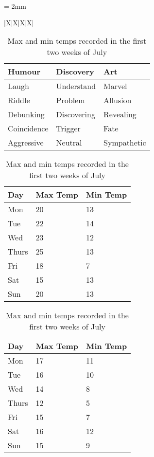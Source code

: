 \begin{table}[h]
  \everyrow{\hrule}
  \tabulinesep = 2mm
  \begin{tabu}{|X|X|X|X|}


\begin{table}[!htb] %
\centering
\begin{tabular}{|l|l|l|}
\hline
\textbf{Humour} & \textbf{Discovery} & \textbf{Art} \\ \hline
Laugh           & Understand         & Marvel       \\ \hline
Riddle          & Problem            & Allusion     \\ \hline
Debunking       & Discovering        & Revealing    \\ \hline
Coincidence     & Trigger            & Fate         \\ \hline
Aggressive      & Neutral            & Sympathetic  \\ \hline
\end{tabular}
\caption[Text for Table of Contents]{Caption text under table}
\end{table}

\begin{table}[h]
    \begin{subtable}[h]{0.45\textwidth}
        \centering
        \begin{tabular}{l | l | l}
        Day & Max Temp & Min Temp \\
        \hline \hline
        Mon & 20 & 13\\
        Tue & 22 & 14\\
        Wed & 23 & 12\\
        Thurs & 25 & 13\\
        Fri & 18 & 7\\
        Sat & 15 & 13\\
        Sun & 20 & 13
        \end{tabular}
        \caption{First Week}
        \label{tab:week1}
    \end{subtable}
    \hfill
    \begin{subtable}[h]{0.45\textwidth}
        \centering
        \begin{tabular}{l | l | l}
        Day & Max Temp & Min Temp \\
        \hline \hline
        Mon & 17 & 11\\
        Tue & 16 & 10\\
        Wed & 14 & 8\\
        Thurs & 12 & 5\\
        Fri & 15 & 7\\
        Sat & 16 & 12\\
        Sun & 15 & 9
        \end{tabular}
        \caption{Second Week}
        \label{tab:week2}
    \end{subtable}
    \caption{Max and min temps recorded in the first two weeks of July}
    \label{tab:temps}
\end{table}


\end{tabu}
\end{table}
